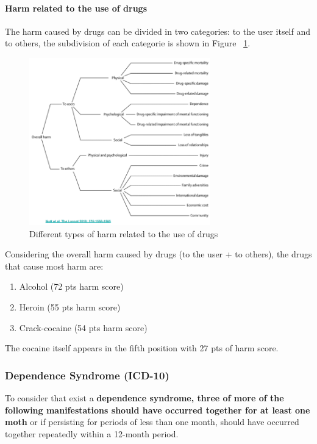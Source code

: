 \documentclass[12pt,article,oneside,a4paper]{memoir}
\begin{document}
\paragraph{Harm related to the use of drugs}
The harm caused by drugs can be divided in two categories: to the user itself and to others, the subdivision of each categorie is shown in Figure ~\ref{fig:harm-drugs}.

\begin{figure}
  \centering
  \includegraphics[width=0.7\textwidth]{imgs/harm-drugs.png}
  \caption{Different types of harm related to the use of drugs}
  \label{fig:harm-drugs}
\end{figure}

Considering the overall harm caused by drugs (to the user + to others), the drugs that cause most harm are: 
\begin{enumerate}
\item Alcohol (72 pts harm score)
\item Heroin (55 pts harm score)
\item Crack-cocaine (54 pts harm score)
\end{enumerate}
The cocaine itself appears in the fifth position with 27 pts of harm score.

\subsubsection{Dependence Syndrome (ICD-10)} 
To consider that exist a \textbf{dependence syndrome, three of more of the following manifestations should have occurred together for at least one moth} or if persisting for periods of less than one month, should have occurred together repeatedly within a 12-month period.
\end{document}

